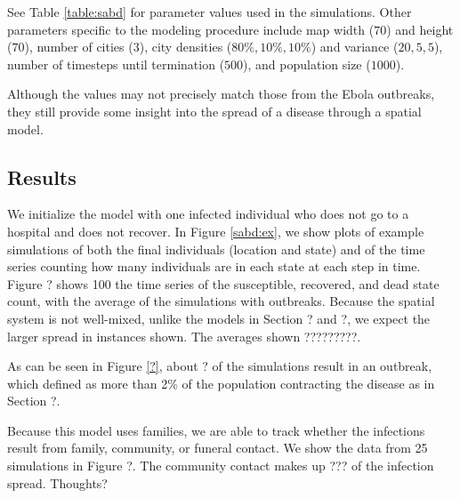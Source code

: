 See Table \ref{table:sabd} for parameter values used in the simulations. Other parameters specific to the modeling procedure include map width ($70$) and height ($70$), number of cities ($3$), city densities ($80\%, 10\%, 10\%$) and variance ($20,5,5$), number of timesteps until termination ($500$), and population size ($1000$).

Although the values may not precisely match those from the Ebola outbreaks, they still provide some insight into the spread of a disease through a spatial model.


\subsection{Results}

We initialize the model with one infected individual who does not go to a hospital and does not recover. In Figure \ref{sabd:ex}, we show plots of example simulations of both the final individuals (location and state) and of the time series counting how many individuals are in each state at each step in time. Figure ? shows 100 the time series of the susceptible, recovered, and dead state count, with the average of the simulations with outbreaks. Because the spatial system is not well-mixed, unlike the models in Section ? and ?, we expect the larger spread in instances shown. The averages shown ?????????. 

As can be seen in Figure \ref{?}, about ? of the simulations result in an outbreak, which defined as more than 2\% of the population contracting the disease as in Section ?. 

Because this model uses families, we are able to track whether the infections result from family, community, or funeral contact. We show the data from 25 simulations in Figure ?. The community contact makes up ??? of the infection spread. Thoughts?


